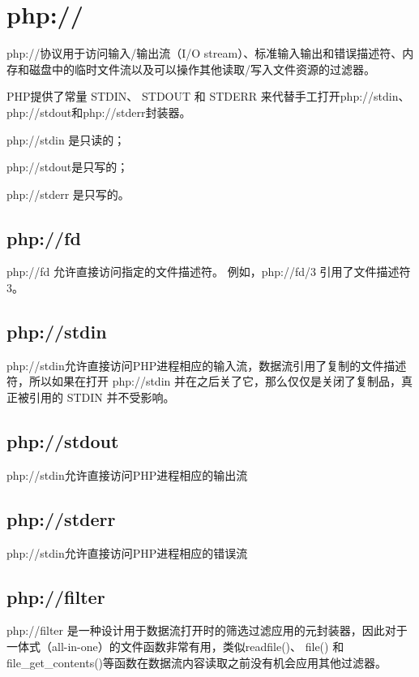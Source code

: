 \section{php://}

php://协议用于访问输入/输出流（I/O stream）、标准输入输出和错误描述符、内存和磁盘中的临时文件流以及可以操作其他读取/写入文件资源的过滤器。

PHP提供了常量 STDIN、 STDOUT 和 STDERR 来代替手工打开php://stdin、php://stdout和php://stderr封装器。

\begin{compactitem}
\item php://stdin 是只读的；
\item php://stdout是只写的；
\item php://stderr 是只写的。
\end{compactitem}

\subsection{php://fd}

php://fd 允许直接访问指定的文件描述符。 例如，php://fd/3 引用了文件描述符 3。

\subsection{php://stdin}

php://stdin允许直接访问PHP进程相应的输入流，数据流引用了复制的文件描述符，所以如果在打开 php://stdin 并在之后关了它，那么仅仅是关闭了复制品，真正被引用的 STDIN 并不受影响。

\subsection{php://stdout}

php://stdin允许直接访问PHP进程相应的输出流

\subsection{php://stderr}

php://stdin允许直接访问PHP进程相应的错误流



\subsection{php://filter}

php://filter 是一种设计用于数据流打开时的筛选过滤应用的元封装器，因此对于一体式（all-in-one）的文件函数非常有用，类似readfile()、 file() 和 file\_get\_contents()等函数在数据流内容读取之前没有机会应用其他过滤器。


